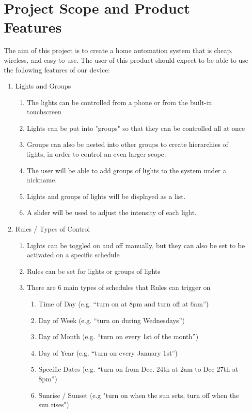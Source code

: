 \documentclass[oneside,openright]{book}
\begin{document}
\section{Project Scope and Product Features}

The aim of this project is to create a home automation system that is cheap, wireless, and easy to use. The user of this product should expect to be able to use the following features of our device:
\begin{enumerate}
\item Lights and Groups
\begin{enumerate}
\item The lights can be controlled from a phone or from the built-in touchscreen
\item Lights can be put into "groups" so that they can be controlled all at once
\item Groups can also be nested into other groups to create hierarchies of lights, in order to control an even larger scope.
\item The user will be able to add groups of lights to the system under a nickname.
\item Lights and groups of lights will be displayed as a list.
\item A slider will be used to adjust the intensity of each light.
\end{enumerate}
\item Rules / Types of Control
\begin{enumerate}
\item Lights can be toggled on and off manually, but they can also be set to be activated on a specific schedule
\item Rules can be set for lights or groups of lights
\item There are 6 main types of schedules that Rules can trigger on
\begin{enumerate}
\item Time of Day (e.g. “turn on at 8pm and turn off at 6am”) 
\item Day of Week  (e.g. “turn on during Wednesdays”)
\item Day of Month  (e.g. “turn on every 1st of the month”)
\item Day of Year  (e.g. “turn on every January 1st”)
\item Specific Dates  (e.g. “turn on from Dec. 24th at 2am to Dec 27th at 8pm”)
\item Sunrise / Sunset (e.g "turn on when the sun sets, turn off when the sun rises")

\end{enumerate}
\end{enumerate}
\end{enumerate}
\end{document}
